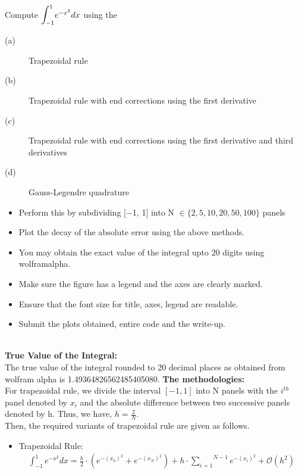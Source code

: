 \documentclass[letterpaper]{exam}
\begin{document}
\begin{questions}
\begin{solution}
\end{solution}
\question [16] Compute $\mathlarger{\mathlarger{\int}}_{-1}^1 e^{-x^2} dx$ using the
\begin{description}
    \item [(a)]  Trapezoidal rule
    \item [(b)]Trapezoidal rule with end corrections using the first derivative
    \item [(c)]Trapezoidal rule with end corrections using the first derivative and third derivatives
    \item [(d)]Gauss-Legendre quadrature
\end{description}
\begin{itemize}
    \item Perform this by subdividing [−1, 1] into N $\in  \{2, 5, 10, 20, 50, 100\}$ panels
    \item  Plot the decay of the absolute error using the above methods.
    \item  You may obtain the exact value of the integral upto 20 digits using wolframalpha.
    \item  Make sure the figure has a legend and the axes are clearly marked.
    \item Ensure that the font size for title, axes, legend are readable.
    \item  Submit the plots obtained, entire code and the write-up.
\end{itemize}
\begin{solution}
\\
\textbf{True Value of the Integral:}\\
The true value of the integral rounded to 20 decimal places as obtained from wolfram alpha is 1.49364826562485405080.
\textbf{The methodologies:}\\
For trapezoidal rule, we divide the interval $\left[-1,1\right]$ into N panels with the $i^{th}$ panel denoted by $x_i$ and the absolute difference between two successive panels denoted by h. Thus, we have, $h = \frac{2}{N}$.\\
Then, the required variants of trapezoidal rule are given as follows.
\begin{itemize}
    \item Trapezoidal Rule:\\
    \begin{align*}
        \int_{-1}^{1} e^{-x^2} dx = \frac{h}{2}\cdot\left(e^{-(x_0)^2}+e^{-(x_N)^2}\right) + h\cdot\overset{N-1}{\underset{i=1}{\sum}} e^{-(x_i)^2} + \mathcal{O}(h^2)

\end{align*}
\end{itemize}
\end{solution}
\end{questions}
\end{document}
